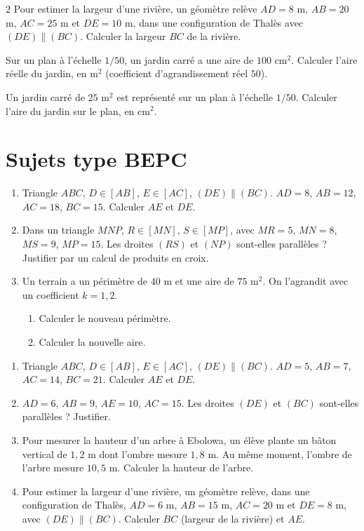 \begin{multicols}{2}
\exo{} Pour estimer la largeur d'une rivière, un géomètre relève $AD=8$ m, $AB=20$
m, $AC=25$ m et $DE=10$ m, dans une configuration de Thalès avec $(DE)\parallel(BC)$.
Calculer la largeur $BC$ de la rivière.

\exo{} Sur un plan à l'échelle $1/50$, un jardin carré a une aire de $100\text{ cm}^2$.
Calculer l'aire réelle du jardin, en $\text{m}^2$ (coefficient d'agrandissement réel $50$).

\exo{} Un jardin carré de $25\text{ m}^2$ est représenté sur un plan à l'échelle
$1/50$. Calculer l'aire du jardin sur le plan, en $\text{cm}^2$.

\end{multicols}

\section{Sujets type BEPC}

\begin{enumerate}[label=\arabic*)]
\item Triangle $ABC$, $D\in[AB]$, $E\in[AC]$, $(DE)\parallel(BC)$. $AD=8$, $AB=12$,
$AC=18$, $BC=15$. Calculer $AE$ et $DE$.
\item Dans un triangle $MNP$, $R\in[MN]$, $S\in[MP]$, avec $MR=5$, $MN=8$, $MS=9$, $MP=15$.
Les droites $(RS)$ et $(NP)$ sont-elles parallèles ? Justifier par un calcul de produits en
croix.
\item Un terrain a un périmètre de $40$ m et une aire de $75\text{ m}^2$. On l'agrandit
avec un coefficient $k=1{,}2$.
\begin{enumerate}[label=\alph*)]
\item Calculer le nouveau périmètre.
\item Calculer la nouvelle aire.
\end{enumerate}
\end{enumerate}

\begin{enumerate}[label=\arabic*)]
\item Triangle $ABC$, $D\in[AB]$, $E\in[AC]$, $(DE)\parallel(BC)$. $AD=5$, $AB=7$,
$AC=14$, $BC=21$. Calculer $AE$ et $DE$.
\item $AD=6$, $AB=9$, $AE=10$, $AC=15$. Les droites $(DE)$ et $(BC)$ sont-elles
parallèles ? Justifier.
\item Pour mesurer la hauteur d'un arbre à Ebolowa, un élève plante un bâton vertical de
$1{,}2$ m dont l'ombre mesure $1{,}8$ m. Au même moment, l'ombre de l'arbre mesure $10{,}5$
m. Calculer la hauteur de l'arbre.
\item Pour estimer la largeur d'une rivière, un géomètre relève, dans une configuration de
Thalès, $AD=6$ m, $AB=15$ m, $AC=20$ m et $DE=8$ m, avec $(DE)\parallel(BC)$. Calculer $BC$
(largeur de la rivière) et $AE$.
\end{enumerate}

